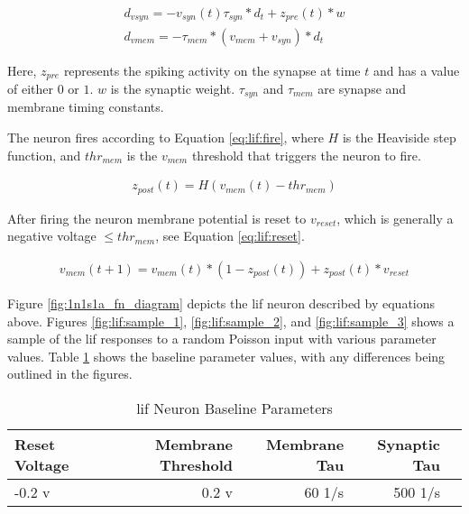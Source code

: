 \begin{align}
d_{vsyn} = -v_{syn}(t) \tau_{syn} * d_t + z_{pre}(t) * w \label{eq:lif:psp} \\
d_{vmem} = -\tau_{mem} * (v_{mem} + v_{syn}) * d_t \label{eq:lif:v}
\end{align}

Here, $z_{pre}$ represents the spiking activity on the synapse at time
$t$ and has a value of either $0$ or $1$. $w$ is the synaptic
weight. $\tau_{syn}$ and $\tau_{mem}$ are synapse and membrane timing
constants.

The neuron fires according to Equation \ref{eq:lif:fire}, where $H$ is the
Heaviside step function, and $thr_{mem}$ is the $v_{mem}$ threshold that
triggers the neuron to fire.

\begin{align}
z_{post}(t) = H(v_{mem}(t) - thr_{mem}) \label{eq:lif:fire}
\end{align}

After firing the neuron membrane potential is reset to $v_{reset}$, which is
generally a negative voltage $\leq thr_{mem}$, see Equation \ref{eq:lif:reset}.

\begin{align}
v_{mem}(t+1) = v_{mem}(t) * (1 - z_{post}(t)) + z_{post}(t) * v_{reset} \label{eq:lif:reset}
\end{align}

Figure \ref{fig:1n1s1a_fn_diagram} depicts the \Gls{lif} neuron described by
equations above. Figures \ref{fig:lif:sample_1}, \ref{fig:lif:sample_2}, and
\ref{fig:lif:sample_3} shows a sample of the \Gls{lif} responses to a random
Poisson input with various parameter values. Table \ref{table:lif_params} shows
the baseline parameter values, with any differences being outlined in the
figures.

\begin{table}[!htp]\centering
  \caption{\Gls{lif} Neuron Baseline Parameters} \label{table:lif_params}
  \scriptsize
  \begin{tabular}{lrrrr}\toprule
    Reset Voltage &Membrane Threshold &Membrane Tau &Synaptic Tau \\\midrule
    -0.2 v &0.2 v &60 1/s &500 1/s \\
    \bottomrule
  \end{tabular}
\end{table}



